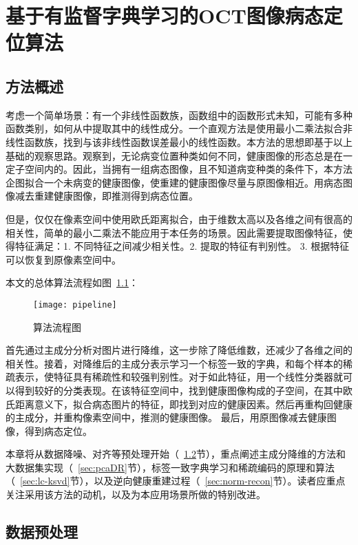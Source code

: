 \chapter{基于有监督字典学习的OCT图像病态定位算法}

\section{方法概述} %
\label{sec:methodOverview}

    考虑一个简单场景：有一个非线性函数族，函数组中的函数形式未知，可能有多种函数类别，如何从中提取其中的线性成分。一个直观方法是使用最小二乘法拟合非线性函数族，找到与该非线性函数误差最小的线性函数。本方法的思想即基于以上基础的观察思路。观察到，无论病变位置种类如何不同，健康图像的形态总是在一定子空间内的。因此，当拥有一组病态图像，且不知道病变种类的条件下，本方法企图拟合一个未病变的健康图像，使重建的健康图像尽量与原图像相近。用病态图像减去重建健康图像，即推测得到病态位置。

    但是，仅仅在像素空间中使用欧氏距离拟合，由于维数太高以及各维之间有很高的相关性，简单的最小二乘法不能应用于本任务的场景。因此需要提取图像特征，使得特征满足：1. 不同特征之间减少相关性。2. 提取的特征有判别性。 3. 根据特征可以恢复到原像素空间中。 

    本文的总体算法流程如图~\ref{fig:pipeline}：
    \begin{figure} %
      \centering
      \texttt{[image: pipeline]}
      \caption{算法流程图}
      \label{fig:pipeline}
    \end{figure}
    首先通过主成分分析对图片进行降维，这一步除了降低维数，还减少了各维之间的相关性。接着，对降维后的主成分表示学习一个标签一致的字典，和每个样本的稀疏表示，使特征具有稀疏性和较强判别性。对于如此特征，用一个线性分类器就可以得到较好的分类表现。在该特征空间中，找到健康图像构成的子空间，在其中欧氏距离意义下，拟合病态图片的特征，即找到对应的健康因素。然后再重构回健康的主成分，并重构像素空间中，推测的健康图像。 最后，用原图像减去健康图像，得到病态定位。

    本章将从数据降噪、对齐等预处理开始（~\ref{sec:Preprocessing}节），重点阐述主成分降维的方法和大数据集实现（~\ref{sec:pcaDR}节），标签一致字典学习和稀疏编码的原理和算法（~\ref{sec:lc-ksvd}节），以及逆向健康重建过程（~\ref{sec:norm-recon}节）。读者应重点关注采用该方法的动机，以及为本应用场景所做的特别改进。



\section{数据预处理}
\label{sec:Preprocessing}

